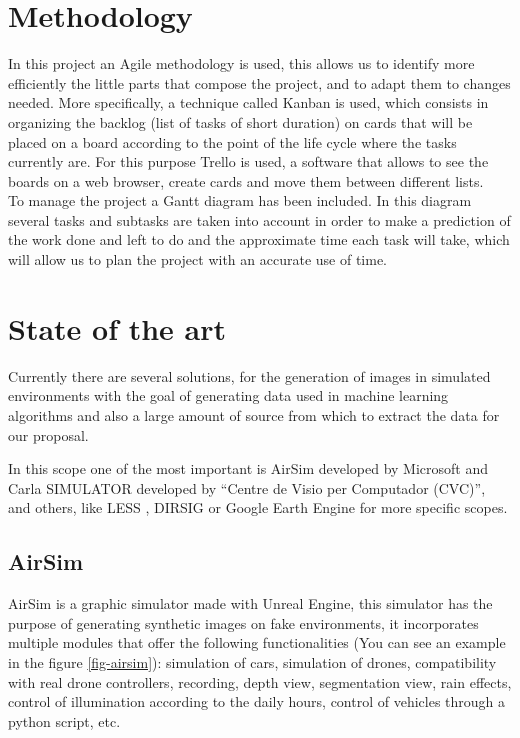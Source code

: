 \documentclass[10pt,a4paper,twocolumn,twoside]{article}
\begin{document}
\section{Methodology}
In this project an Agile methodology is used,  this allows us to identify more efficiently the little parts that compose the project, and to adapt them to changes needed. More specifically, a technique called Kanban \cite{kanban} is used, which consists in organizing the backlog (list of tasks of short duration) on cards that will be placed on a board according to the point of the life cycle where the tasks currently are. For this purpose Trello \cite{trello} is used, a software that allows to see the boards on a web browser, create cards and move them between different lists.
\\
To manage the project a Gantt diagram has been included. In this diagram several tasks and subtasks are 	taken into account in order to make a prediction of the work done and left to do and the approximate time each task will take, which will allow us to plan the  project with an accurate use of time.

\section{State of the art}
\label{estatart}

Currently there are several solutions, for the generation of images in simulated environments with the goal of generating data used in machine learning algorithms and also a large amount of source from which to extract the data for our proposal.

In this scope one of the most important is AirSim \cite{airsim} developed by Microsoft and Carla SIMULATOR \cite{carla} developed by ``Centre de Visio per Computador (CVC)'', and others, like LESS \cite{less}, DIRSIG \cite{dirsig} or Google Earth Engine \cite{googleearth} for more specific scopes.

\subsection{AirSim}
AirSim is a graphic simulator made with Unreal Engine, this simulator has the purpose of generating synthetic images on fake environments, it incorporates multiple modules that offer the following functionalities (You can see an example in the figure \ref{fig-airsim}): simulation of cars, simulation of drones, compatibility with real drone controllers, recording, depth view, segmentation view, rain effects, control of illumination according to the daily hours, control of vehicles through a python script, etc.
\end{document}
